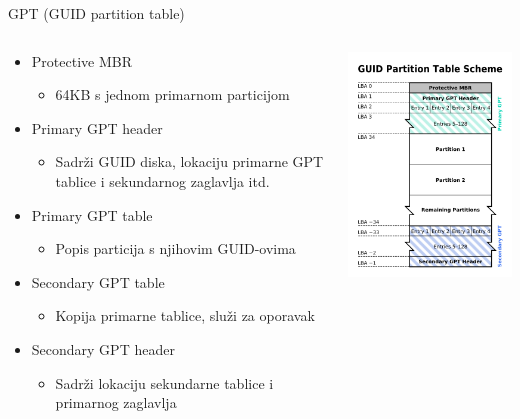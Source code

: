 \documentclass[croatian,t]{beamer} %
\begin{document}
	\begin{frame}{GPT (GUID partition table)}
    \begin{columns}[c]
        \begin{column}{7cm}
            \begin{itemize}
            \item Protective MBR
            \begin{itemize}
            	\item 64KB s jednom primarnom particijom
            \end{itemize}
            \item Primary GPT header
            \begin{itemize}
            	\item Sadrži GUID diska, lokaciju primarne GPT tablice i sekundarnog zaglavlja itd.
            \end{itemize}
            \item Primary GPT table
            \begin{itemize}
            	\item Popis particija s njihovim GUID-ovima
            \end{itemize}
			\item Secondary GPT table
			\begin{itemize}
				\item Kopija primarne tablice, služi za oporavak
			\end{itemize}
			\item Secondary GPT header
			\begin{itemize}
				\item Sadrži lokaciju sekundarne tablice i primarnog zaglavlja
			\end{itemize}
            \end{itemize}
        \end{column}
        \begin{column}{5cm}
            \includegraphics[scale=0.5]{../pics/gpt.png}
        \end{column}
    \end{columns}
	\end{frame}
	
\end{document}
